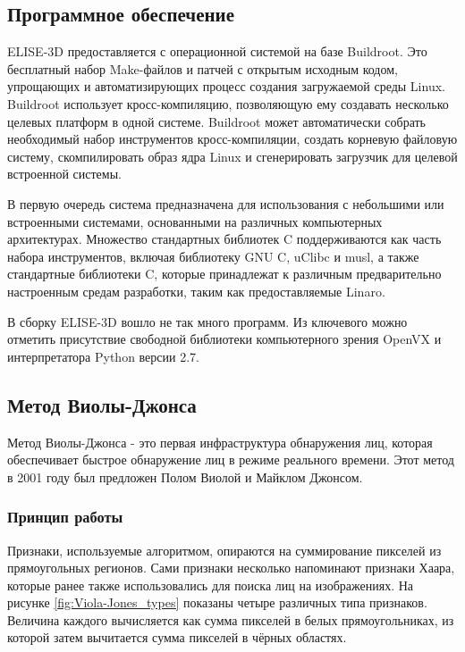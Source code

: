 \documentclass[14pt,a4paper]{scrartcl}
\begin{document}
	\subsection{Программное обеспечение}
	
		ELISE-3D предоставляется с операционной системой на базе Buildroot. Это бесплатный набор Make-файлов и патчей с открытым исходным кодом, упрощающих и автоматизирующих процесс создания загружаемой среды Linux. Buildroot использует кросс-компиляцию, позволяющую ему создавать несколько целевых платформ в одной системе. Buildroot может автоматически собрать необходимый набор инструментов кросс-компиляции, создать корневую файловую систему, скомпилировать образ ядра Linux и сгенерировать загрузчик для целевой встроенной системы.
		
		В первую очередь система предназначена для использования с небольшими или встроенными системами, основанными на различных компьютерных архитектурах. Множество стандартных библиотек C поддерживаются как часть набора инструментов, включая библиотеку GNU C, uClibc и musl, а также стандартные библиотеки C, которые принадлежат к различным предварительно настроенным средам разработки, таким как предоставляемые Linaro\cite{bib:Buildroot_Wikipedia}. 
		
		В сборку ELISE-3D вошло не так много программ. Из ключевого можно отметить присутствие свободной библиотеки компьютерного зрения OpenVX и интерпретатора Python версии 2.7.
		
	\subsection{Метод Виолы-Джонса}
	
		Метод Виолы-Джонса - это первая инфраструктура обнаружения лиц, которая обеспечивает быстрое обнаружение лиц в режиме реального времени. Этот метод в 2001 году был предложен Полом Виолой и Майклом Джонсом\cite{bib:Viola-Jones_Wikipedia}.
	
		\subsubsection{Принцип работы}
		
			Признаки, используемые алгоритмом, опираются на суммирование пикселей из прямоугольных регионов. Сами признаки несколько напоминают признаки Хаара, которые ранее также использовались для поиска лиц на изображениях. На рисунке \ref{fig:Viola-Jones_types} показаны четыре различных типа признаков. Величина каждого вычисляется как сумма пикселей в белых прямоугольниках, из которой затем вычитается сумма пикселей в чёрных областях\cite{bib:Viola-Jones_Wikipedia_Ru}.
			
\end{document}
